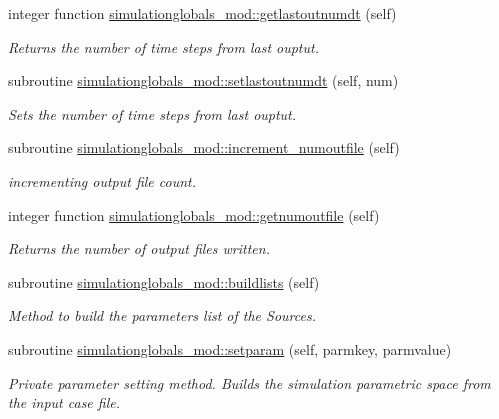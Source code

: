 \begin{DoxyCompactItemize}
integer function \mbox{\hyperlink{namespacesimulationglobals__mod_ac643661b27d17726e0305e34370de5c3}{simulationglobals\+\_\+mod\+::getlastoutnumdt}} (self)
\begin{DoxyCompactList}\small\item\em Returns the number of time steps from last ouptut. \end{DoxyCompactList}\item 
subroutine \mbox{\hyperlink{namespacesimulationglobals__mod_ab760ab6064743ff54237166301346616}{simulationglobals\+\_\+mod\+::setlastoutnumdt}} (self, num)
\begin{DoxyCompactList}\small\item\em Sets the number of time steps from last ouptut. \end{DoxyCompactList}\item 
subroutine \mbox{\hyperlink{namespacesimulationglobals__mod_a77d7175bc03e472ee9a00ee9f6ff1b0e}{simulationglobals\+\_\+mod\+::increment\+\_\+numoutfile}} (self)
\begin{DoxyCompactList}\small\item\em incrementing output file count. \end{DoxyCompactList}\item 
integer function \mbox{\hyperlink{namespacesimulationglobals__mod_a2b76dc3e6cbf1256253c54903df8393b}{simulationglobals\+\_\+mod\+::getnumoutfile}} (self)
\begin{DoxyCompactList}\small\item\em Returns the number of output files written. \end{DoxyCompactList}\item 
subroutine \mbox{\hyperlink{namespacesimulationglobals__mod_a20a4476e2a8dbec4c1aaa202a14b4a40}{simulationglobals\+\_\+mod\+::buildlists}} (self)
\begin{DoxyCompactList}\small\item\em Method to build the parameters list of the Sources. \end{DoxyCompactList}\item 
subroutine \mbox{\hyperlink{namespacesimulationglobals__mod_ada0b6ffc5e112afbd86cdaa8d9aa55d8}{simulationglobals\+\_\+mod\+::setparam}} (self, parmkey, parmvalue)
\begin{DoxyCompactList}\small\item\em Private parameter setting method. Builds the simulation parametric space from the input case file. \end{DoxyCompactList}\item 

\end{DoxyCompactItemize}
